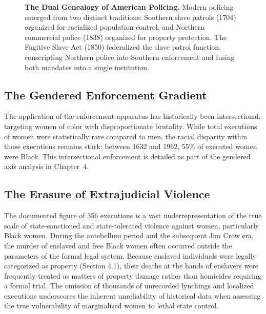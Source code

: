 \documentclass[12pt,openany]{book}
\begin{document}
\begin{figure}[htbp]
\caption{\textbf{The Dual Genealogy of American Policing.} Modern policing emerged from two distinct traditions: Southern slave patrols (1704) organized for racialized population control, and Northern commercial police (1838) organized for property protection. The Fugitive Slave Act (1850) federalized the slave patrol function, conscripting Northern police into Southern enforcement and fusing both mandates into a single institution.}
\label{fig:policing_genealogy}
\end{figure}

\subsection{The Gendered Enforcement Gradient}

The application of the enforcement apparatus has historically been intersectional, targeting women of color with disproportionate brutality. While total executions of women were statistically rare compared to men, the racial disparity within those executions remains stark: between 1632 and 1962, 55\% of executed women were Black. This intersectional enforcement is detailed as part of the gendered axis analysis in Chapter~4.

\subsection{The Erasure of Extrajudicial Violence}

The documented figure of 356 executions is a vast underrepresentation of the true scale of state-sanctioned and state-tolerated violence against women, particularly Black women. During the antebellum period and the subsequent Jim Crow era, the murder of enslaved and free Black women often occurred outside the parameters of the formal legal system. Because enslaved individuals were legally categorized as property (Section 4.1), their deaths at the hands of enslavers were frequently treated as matters of property damage rather than homicides requiring a formal trial. The omission of thousands of unrecorded lynchings and localized executions underscores the inherent unreliability of historical data when assessing the true vulnerability of marginalized women to lethal state control.
\end{document}
